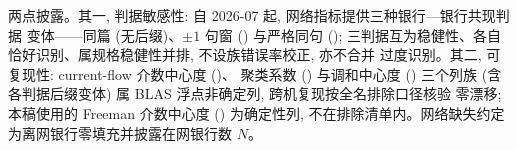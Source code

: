 两点披露。其一, 判据敏感性: 自 2026-07 起, 网络指标提供三种银行—银行共现判据
变体——同篇 (无后缀)、$\pm 1$ 句窗 () 与严格同句 ();
三判据互为稳健性、各自恰好识别、属规格稳健性并排, 不设族错误率校正, 亦不合并
过度识别。其二, 可复现性: current-flow 介数中心度 ()、
聚类系数 () 与调和中心度 ()
三个列族 (含各判据后缀变体) 属 BLAS 浮点非确定列, 跨机复现按全名排除口径核验
零漂移; 本稿使用的 Freeman 介数中心度 () 为确定性列,
不在排除清单内。网络缺失约定为离网银行零填充并披露在网银行数 $N$。

\printbibliography


